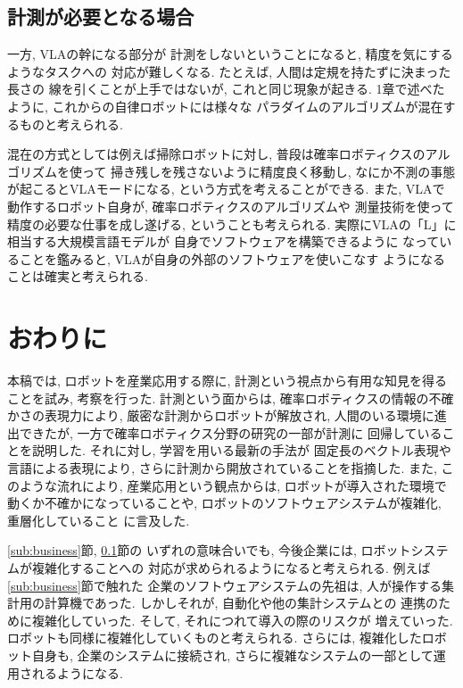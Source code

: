 \documentclass[twocolumn]{jarticle} %
\begin{document}

\subsection{計測が必要となる場合}\label{sub:complex}


一方, VLAの幹になる部分が
計測をしないということになると, 
精度を気にするようなタスクへの
対応が難しくなる. 
たとえば, 人間は定規を持たずに決まった長さの
線を引くことが上手ではないが, 
これと同じ現象が起きる. 
1章で述べたように, 
これからの自律ロボットには様々な
パラダイムのアルゴリズムが混在するものと考えられる. 


混在の方式としては例えば掃除ロボットに対し, 
普段は確率ロボティクスのアルゴリズムを使って
掃き残しを残さないように精度良く移動し, 
なにか不測の事態が起こるとVLAモードになる, 
という方式を考えることができる. 
また, VLAで動作するロボット自身が, 
確率ロボティクスのアルゴリズムや
測量技術を使って精度の必要な仕事を成し遂げる, 
ということも考えられる. 
実際にVLAの「L」に相当する大規模言語モデルが
自身でソフトウェアを構築できるように
なっていることを鑑みると, 
VLAが自身の外部のソフトウェアを使いこなす
ようになることは確実と考えられる. 


\section{おわりに}

本稿では, ロボットを産業応用する際に, 
計測という視点から有用な知見を得ることを試み, 
考察を行った. 
計測という面からは, 
確率ロボティクスの情報の不確かさの表現力により, 
厳密な計測からロボットが解放され, 
人間のいる環境に進出できたが, 
一方で確率ロボティクス分野の研究の一部が計測に
回帰していることを説明した. 
それに対し, 学習を用いる最新の手法が
固定長のベクトル表現や言語による表現により, 
さらに計測から開放されていることを指摘した. 
また, このような流れにより, 
産業応用という観点からは, 
ロボットが導入された環境で動くか不確かになっていることや, 
ロボットのソフトウェアシステムが複雑化, 重層化していること
に言及した. 



\ref{sub:business}節, \ref{sub:complex}節の
いずれの意味合いでも, 今後企業には, 
ロボットシステムが複雑化することへの
対応が求められるようになると考えられる. 
例えば\ref{sub:business}節で触れた
企業のソフトウェアシステムの先祖は, 
人が操作する集計用の計算機であった. 
しかしそれが, 自動化や他の集計システムとの
連携のために複雑化していった. 
そして, それにつれて導入の際のリスクが
増えていった. 
ロボットも同様に複雑化していくものと考えられる. 
さらには, 
複雑化したロボット自身も, 企業のシステムに接続され, 
さらに複雑なシステムの一部として運用されるようになる. 
\end{document}
